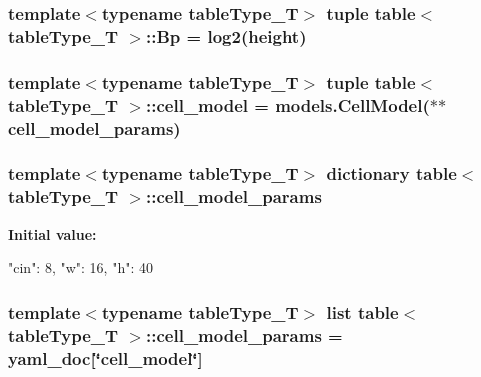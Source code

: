 \label{classtable_a605882d69786546555960d11c3b4ffb0}
\hypertarget{classtable_afe0f82947b2ec532e47c5ce352fdfc7b}{
\subsubsection[{Bp}]{\setlength{\rightskip}{0pt plus 5cm}template$<$typename tableType\_\-T$>$ tuple {\bf table}$<$ tableType\_\-T $>$::{\bf Bp} = log2({\bf height})}}
\label{classtable_afe0f82947b2ec532e47c5ce352fdfc7b}
\hypertarget{classtable_af189382302593d719e7099c7ba0170c9}{
\subsubsection[{cell\_\-model}]{\setlength{\rightskip}{0pt plus 5cm}template$<$typename tableType\_\-T$>$ tuple {\bf table}$<$ tableType\_\-T $>$::{\bf cell\_\-model} = {\bf models.CellModel}($\ast$$\ast${\bf cell\_\-model\_\-params})}}
\label{classtable_af189382302593d719e7099c7ba0170c9}
\hypertarget{classtable_affb2ec85d44634a9b5e4791b756489ca}{
\subsubsection[{cell\_\-model\_\-params}]{\setlength{\rightskip}{0pt plus 5cm}template$<$typename tableType\_\-T$>$ dictionary {\bf table}$<$ tableType\_\-T $>$::{\bf cell\_\-model\_\-params}}}
\label{classtable_affb2ec85d44634a9b5e4791b756489ca}
{\bfseries Initial value:}
\begin{DoxyCode}
{"cin": 8,
                         "w": 16,
                         "h": 40}
\end{DoxyCode}
\hypertarget{classtable_a252e7ab94c46dafbdab734b5ceedc267}{
\subsubsection[{cell\_\-model\_\-params}]{\setlength{\rightskip}{0pt plus 5cm}template$<$typename tableType\_\-T$>$ list {\bf table}$<$ tableType\_\-T $>$::{\bf cell\_\-model\_\-params} = {\bf yaml\_\-doc}\mbox{[}\char`\"{}cell\_\-model\char`\"{}\mbox{]}}}
